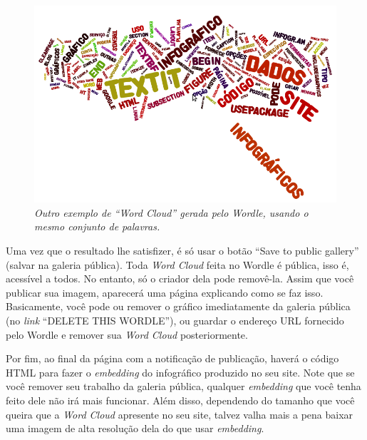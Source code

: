 \documentclass[12pt,onecolumn]{article}
\begin{document}
    \begin{figure}[ht]
      \centering
      \includegraphics[width=.9\linewidth]{wordle-2.png}
      \caption{
        \footnotesize
        \it
        Outro exemplo de ``Word Cloud'' gerada pelo Wordle, usando o mesmo
        conjunto de palavras.
      }
      \label{fig:wordle-2}
    \end{figure}
    
    Uma vez que o resultado lhe satisfizer, é só usar o botão ``Save to public
    gallery'' (salvar na galeria pública). Toda \textit{Word Cloud} feita no
    Wordle é pública, isso é, acessível a todos. No entanto, só o criador dela
    pode removê-la. Assim que você publicar sua imagem, aparecerá uma página
    explicando como se faz isso. Basicamente, você pode ou remover o gráfico
    imediatamente da galeria pública (no \textit{link} ``DELETE THIS WORDLE''),
    ou guardar o endereço URL fornecido pelo Wordle e remover sua \textit{Word
    Cloud} posteriormente.
    
    Por fim, ao final da página com a notificação de publicação, haverá o código
    HTML para fazer o \textit{embedding} do infográfico produzido no seu site.
    Note que se você remover seu trabalho da galeria pública, qualquer
    \textit{embedding} que você tenha feito dele não irá mais funcionar. Além
    disso, dependendo do tamanho que você queira que a \emph{Word Cloud}
    apresente no seu site, talvez valha mais a pena baixar uma imagem de alta
    resolução dela do que usar \emph{embedding}.
\end{document}
